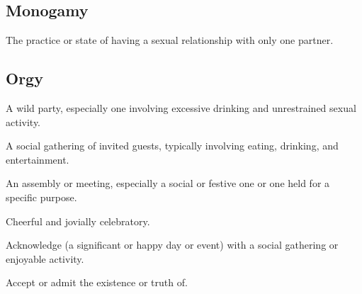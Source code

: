 %

        \subsection{Monogamy}

            \begin{definition}[Monogamy]
            \label{def:monogamy}
                The practice or state of having a sexual relationship with only one partner.
            \end{definition}

        \subsection{Orgy}

            \begin{definition}[Orgy]
            \label{def:orgy}
                A wild party, especially one involving excessive drinking and unrestrained sexual activity.
            \end{definition}

            \begin{definition}[Party]
            \label{def:party}
                A social gathering of invited guests, typically involving eating, drinking, and entertainment.
            \end{definition}

            \begin{definition}[Gathering]
            \label{def:gathering}
                An assembly or meeting, especially a social or festive one or one held for a specific purpose.
            \end{definition}

            \begin{definition}[Festive]
            \label{def:festive}
                Cheerful and jovially celebratory.
            \end{definition}

            \begin{definition}[Celebrate]
            \label{def:celebrate}
                Acknowledge (a significant or happy day or event) with a social gathering or enjoyable activity.
            \end{definition}

            \begin{definition}[Aknowledge]
                Accept or admit the existence or truth of.
            \end{definition}

